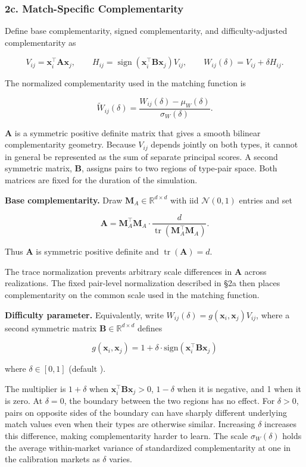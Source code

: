 \documentclass[11pt]{article}
\begin{document}
\subsubsection{2c. Match-Specific Complementarity}\label{c.-match-specific-complementarity}

Define base complementarity, signed complementarity, and difficulty-adjusted complementarity as

\[
V_{ij}=\mathbf{x}_i^\top\mathbf A\mathbf{x}_j,
\qquad
H_{ij}=\operatorname{sign}(\mathbf{x}_i^\top\mathbf B\mathbf{x}_j)V_{ij},
\qquad
W_{ij}(\delta)=V_{ij}+\delta H_{ij}.
\]

The normalized complementarity used in the matching function is

\[
\widetilde W_{ij}(\delta)
=\frac{W_{ij}(\delta)-\mu_W(\delta)}{\sigma_W(\delta)}.
\]

\(\mathbf{A}\) is a symmetric positive definite matrix that gives a smooth bilinear complementarity geometry. Because \(V_{ij}\) depends jointly on both types, it cannot in general be represented as the sum of separate principal scores. A second symmetric matrix, \(\mathbf{B}\), assigns pairs to two regions of type-pair space. Both matrices are fixed for the duration of the simulation.

\textbf{Base complementarity.} Draw \(\mathbf{M}_A\in\mathbb{R}^{d\times d}\) with iid \(\mathcal{N}(0,1)\) entries and set

\[
\mathbf{A}=\mathbf{M}_A^\top\mathbf{M}_A\cdot\frac{d}{\operatorname{tr}(\mathbf{M}_A^\top\mathbf{M}_A)}.
\]

Thus \(\mathbf{A}\) is symmetric positive definite and \(\operatorname{tr}(\mathbf{A})=d\).

The trace normalization prevents arbitrary scale differences in \(\mathbf{A}\) across realizations. The fixed pair-level normalization described in §2a then places complementarity on the common scale used in the matching function.

\textbf{Difficulty parameter.} Equivalently, write \(W_{ij}(\delta)=g(\mathbf{x}_i,\mathbf{x}_j)V_{ij}\), where a second symmetric matrix \(\mathbf{B}\in\mathbb{R}^{d\times d}\) defines

\[g(\mathbf{x}_i, \mathbf{x}_j) = 1 + \delta \cdot \text{sign}(\mathbf{x}_i^\top \mathbf{B} \mathbf{x}_j)\]

where \(\delta\in[0,1]\) (default ).

The multiplier is \(1+\delta\) when \(\mathbf{x}_i^\top\mathbf{B}\mathbf{x}_j>0\), \(1-\delta\) when it is negative, and 1 when it is zero. At \(\delta=0\), the boundary between the two regions has no effect. For \(\delta>0\), pairs on opposite sides of the boundary can have sharply different underlying match values even when their types are otherwise similar. Increasing \(\delta\) increases this difference, making complementarity harder to learn. The scale \(\sigma_W(\delta)\) holds the average within-market variance of standardized complementarity at one in the calibration markets as \(\delta\) varies.
\end{document}
